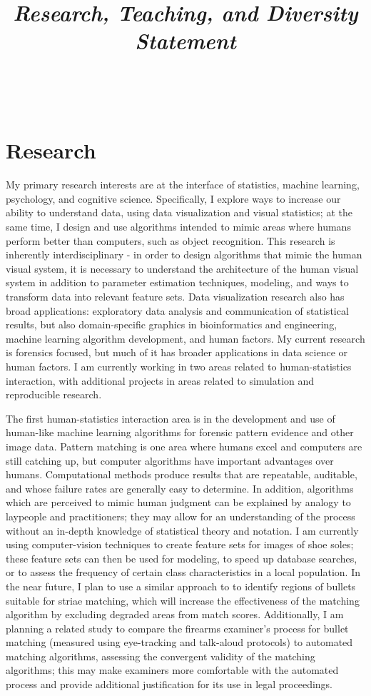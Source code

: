 \documentclass[12pt, letterpaper, sans]{moderncv}
\title{\emph{Research, Teaching, and Diversity Statement}}
\makeatletter
\newcommand{\makesimpletitle}{%
  \recomputeletterlengths%

  \begin{varwidth}[c]{.75\textwidth}
  \if@left\raggedright\fi%
      \if@right\raggedleft\fi%
      \ifthenelse{\equal{\@title}{}}{}{\titlestyle{\@title}}%
  \end{varwidth}\hfill
  \begin{varwidth}[c]{.25\textwidth}%
      \raggedleft%
      \addressfont\textcolor{color2}{%
        {\bfseries\upshape\@firstname~\@lastname}\\
        \ifthenelse{\isundefined{\@addressstreet}}{}{\makenewline\addresssymbol\@addressstreet%
          \ifthenelse{\equal{\@addresscity}{}}{}{\makenewline\@addresscity}%
          \ifthenelse{\equal{\@addresscountry}{}}{}{\makenewline\@addresscountry}}%
        \collectionloop{phones}{%
          \makenewline\csname\collectionloopkey phonesymbol\endcsname\collectionloopitem}%
        \ifthenelse{\isundefined{\@email}}{}{\makenewline\emailsymbol\emaillink{\@email}}%
        \ifthenelse{\isundefined{\@homepage}}{}{\makenewline\homepagesymbol\httplink{\@homepage}}%
        \ifthenelse{\isundefined{\@extrainfo}}{}{\makenewline\@extrainfo}}
    \end{varwidth}
}
\makeatother
\begin{document}
\makesimpletitle

\section{Research}

My primary research interests are at the interface of statistics, machine learning, psychology, and cognitive science. Specifically, I explore ways to increase our ability to understand data, using data visualization and visual statistics; at the same time, I design and use algorithms intended to mimic areas where humans perform better than computers, such as object recognition. This research is inherently interdisciplinary - in order to design algorithms that mimic the human visual system, it is necessary to understand the architecture of the human visual system in addition to parameter estimation techniques, modeling, and ways to transform data into relevant feature sets. Data visualization research also has broad applications: exploratory data analysis and communication of statistical results, but also domain-specific graphics in bioinformatics and engineering, machine learning algorithm development, and human factors. My current research is forensics focused, but much of it has broader applications in data science or human factors. I am currently working in two areas related to human-statistics interaction, with additional projects in areas related to simulation and reproducible research. 

The first human-statistics interaction area is in the development and use of human-like machine learning algorithms for forensic pattern evidence and other image data. Pattern matching is one area where humans excel and computers are still catching up, but computer algorithms have important advantages over humans. Computational methods produce results that are repeatable, auditable, and whose failure rates are generally easy to determine. In addition, algorithms which are perceived to mimic human judgment can be explained by analogy to laypeople and practitioners; they may allow for an understanding of the process without an in-depth knowledge of statistical theory and notation. I am currently using computer-vision techniques to create feature sets for images of shoe soles; these feature sets can then be used for modeling, to speed up database searches, or to assess the frequency of certain class characteristics in a local population. In the near future, I plan to use a similar approach to to identify regions of bullets suitable for striae matching, which will increase the effectiveness of the matching algorithm by excluding degraded areas from match scores. Additionally, I am planning a related study to compare the firearms examiner's process for bullet matching (measured using eye-tracking and talk-aloud protocols) to automated matching algorithms, assessing the convergent validity of the matching algorithms; this may make examiners more comfortable with the automated process and provide additional justification for its use in legal proceedings. 
\end{document}
